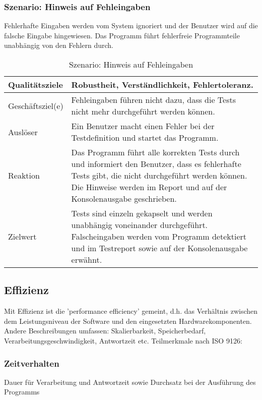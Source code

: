 \documentclass[
	ngerman,
	toc=listof, %
	toc=bibliography, %
	footnotes=multiple, %
	parskip=half, %
	numbers=noendperiod %
]{scrartcl}
\begin{document}
		\subsubsection{Szenario: Hinweis auf Fehleingaben}
		Fehlerhafte Eingaben werden vom System ignoriert und der Benutzer wird auf die falsche Eingabe hingewiesen. Das Programm führt fehlerfreie Programmteile unabhängig von den Fehlern durch.
		
		\begin{table}[!h]
			\begin{tabularx}{\textwidth}{lX}
				\toprule
				Qualitätsziele & Robustheit, Verständlichkeit, Fehlertoleranz.  \\
				\midrule
				Geschäftsziel(e) & Fehleingaben führen nicht dazu, dass die Tests nicht mehr durchgeführt werden können.  \\
				\midrule
				Auslöser & Ein Benutzer macht einen Fehler bei der Testdefinition und startet das Programm.  \\
				\midrule
				Reaktion & Das Programm führt alle korrekten Tests durch und informiert den Benutzer, dass es fehlerhafte Tests gibt, die nicht durchgeführt werden können. Die Hinweise werden im Report und auf der Konsolenausgabe geschrieben.   \\
				\midrule
				Zielwert & Tests sind einzeln gekapselt und werden unabhängig voneinander durchgeführt. Falscheingaben werden vom Programm detektiert und im Testreport sowie auf der Konsolenausgabe erwähnt.  \\
				\bottomrule
			\end{tabularx}
			\caption{Szenario: Hinweis auf Fehleingaben}
		\end{table}
		
		
	\subsection{Effizienz}
	Mit Effizienz ist die 'performance efficiency' gemeint, d.h. das Verhältnis zwischen dem Leistungsniveau der Software und den eingesetzten Hardwarekomponenten. 
	Andere Beschreibungen umfassen: Skalierbarkeit, Speicherbedarf, Verarbeitungsgeschwindigkeit, Antwortzeit etc.
	Teilmerkmale nach ISO 9126:

		\subsubsection{Zeitverhalten}
		Dauer für Verarbeitung und Antwortzeit sowie Durchsatz bei der Ausführung des Programms
\end{document}
